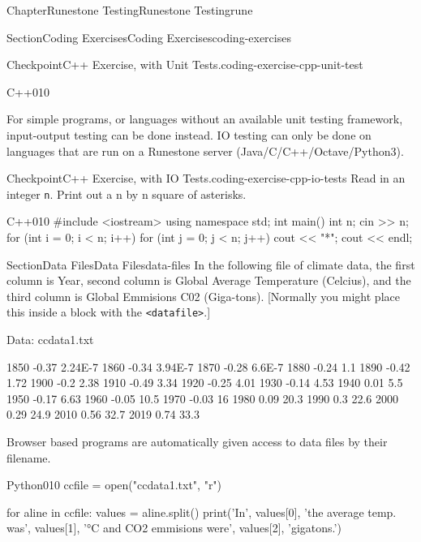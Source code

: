 \documentclass[oneside,10pt,]{book}
\newcommand{\mono}[1]{\texttt{#1}}
\numberwithin{equation}{section}
\begin{document}
\begin{chapterptx}{Chapter}{Runestone Testing}{}{Runestone Testing}{}{}{rune}
\begin{sectionptx}{Section}{Coding Exercises}{}{Coding Exercises}{}{}{coding-exercises}
\begin{inlineexercise}{Checkpoint}{C++ Exercise, with Unit Tests.}{coding-exercise-cpp-unit-test}
\begin{program}{C++}{0}{1}{0}
{}
\end{program}
\end{inlineexercise}%
For simple programs, or languages without an available unit testing framework, input-output testing can be done instead. IO testing can only be done on languages that are run on a Runestone server (Java\slash{}C\slash{}C++\slash{}Octave\slash{}Python3).%
\begin{inlineexercise}{Checkpoint}{C++ Exercise, with IO Tests.}{coding-exercise-cpp-io-tests}%
Read in an integer \mono{n}. Print out a n by n square of asterisks.%
\begin{program}{C++}{0}{1}{0}
#include <iostream>
using namespace std;
int main() {
    int n;
    cin >> n;
    for (int i = 0; i < n; i++) {
        for (int j = 0; j < n; j++) {
            cout << "*";
        }
        cout << endl;
    }
}
\end{program}
\end{inlineexercise}%
\end{sectionptx}
%
%
\typeout{************************************************}
\typeout{************************************************}
%
\begin{sectionptx}{Section}{Data Files}{}{Data Files}{}{}{data-files}
In the following file of climate data, the first column is Year, second column is Global Average Temperature (Celcius), and the third column is Global Emmisions C02 (Giga-tons).  [Normally you might place this inside a block with the \mono{<datafile>}.]%
\begin{preformatted}
Data: ccdata1.txt
\end{preformatted}
\begin{preformatted}
1850    -0.37     2.24E-7
1860    -0.34     3.94E-7
1870    -0.28     6.6E-7
1880    -0.24     1.1
1890    -0.42     1.72
1900    -0.2      2.38
1910    -0.49     3.34
1920    -0.25     4.01
1930    -0.14     4.53
1940     0.01     5.5
1950    -0.17     6.63
1960    -0.05     10.5
1970    -0.03     16
1980     0.09     20.3
1990     0.3      22.6
2000     0.29     24.9
2010     0.56     32.7
2019     0.74     33.3
\end{preformatted}
Browser based programs are automatically given access to data files by their filename.%
\begin{program}{Python}{0}{1}{0}
ccfile = open("ccdata1.txt", "r")

for aline in ccfile:
    values = aline.split()
    print('In', values[0], 'the average temp. was', values[1], '°C and CO2 emmisions were', values[2], 'gigatons.')


\end{program}
\end{sectionptx}
\end{chapterptx}
\end{document}
